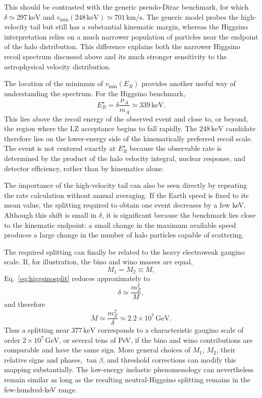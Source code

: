\documentclass[aps,prd,reprint,superscriptaddress,nofootinbib,longbibliography,floatfix]{revtex4-2}
\newcommand{\GeV}{\mathrm{GeV}}
\newcommand{\keV}{\mathrm{keV}}
\begin{document}
This should be contrasted with the generic pseudo-Dirac benchmark, for which $\delta\simeq297\,\keV$ and $v_{\min}(248\,\keV)\simeq701\,\mathrm{km/s}$. The generic model probes the high-velocity tail but still has a substantial kinematic margin, whereas the Higgsino interpretation relies on a much narrower population of particles near the endpoint of the halo distribution. This difference explains both the narrower Higgsino recoil spectrum discussed above and its much stronger sensitivity to the astrophysical velocity distribution.

The location of the minimum of $v_{\min}(E_R)$ provides another useful way of understanding the spectrum. For the Higgsino benchmark,
\begin{equation}
E_R^\star=\delta\frac{\mu_A}{m_A}\simeq339\,\keV.
\end{equation}
This lies above the recoil energy of the observed event and close to, or beyond, the region where the LZ acceptance begins to fall rapidly. The $248\,\keV$ candidate therefore lies on the lower-energy side of the kinematically preferred recoil scale. The event is not centered exactly at $E_R^\star$ because the observable rate is determined by the product of the halo velocity integral, nuclear response, and detector efficiency, rather than by kinematics alone.

The importance of the high-velocity tail can also be seen directly by repeating the rate calculation without annual averaging. If the Earth speed is fixed to its mean value, the splitting required to obtain one event decreases by a few keV. Although this shift is small in $\delta$, it is significant because the benchmark lies close to the kinematic endpoint: a small change in the maximum available speed produces a large change in the number of halo particles capable of scattering.

The required splitting can finally be related to the heavy electroweak gaugino scale. If, for illustration, the bino and wino masses are equal,
\begin{equation}
M_1=M_2\equiv M,
\end{equation}
Eq.~\eqref{eq:higgsinosplit} reduces approximately to
\begin{equation}
\delta\simeq\frac{m_Z^2}{M},
\end{equation}
and therefore
\begin{equation}
M\simeq\frac{m_Z^2}{\delta}
\simeq2.2\times10^7\,\GeV.
\end{equation}
Thus a splitting near $377\,\keV$ corresponds to a characteristic gaugino scale of order $2\times10^7\,\GeV$, or several tens of PeV, if the bino and wino contributions are comparable and have the same sign. More general choices of $M_1$, $M_2$, their relative signs and phases, $\tan\beta$, and threshold corrections can modify this mapping substantially. The low-energy inelastic phenomenology can nevertheless remain similar as long as the resulting neutral-Higgsino splitting remains in the few-hundred-keV range.
\end{document}
